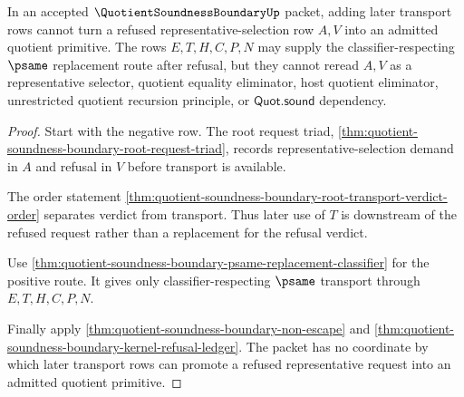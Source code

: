 \begin{theorem}
\label{thm:quotient-soundness-boundary-refusal-verdict-monotonicity}
In an accepted $\QuotientSoundnessBoundaryUp$ packet, adding later transport rows cannot turn a refused representative-selection row $A,V$ into an admitted quotient primitive. The rows $E,T,H,C,P,N$ may supply the classifier-respecting $\psame$ replacement route after refusal, but they cannot reread $A,V$ as a representative selector, quotient equality eliminator, host quotient eliminator, unrestricted quotient recursion principle, or $\mathsf{Quot.sound}$ dependency.
\end{theorem}
\begin{proof}
Start with the negative row. The root request triad, \autoref{thm:quotient-soundness-boundary-root-request-triad}, records representative-selection demand in $A$ and refusal in $V$ before transport is available.

The order statement \autoref{thm:quotient-soundness-boundary-root-transport-verdict-order} separates verdict from transport. Thus later use of $T$ is downstream of the refused request rather than a replacement for the refusal verdict.

Use \autoref{thm:quotient-soundness-boundary-psame-replacement-classifier} for the positive route. It gives only classifier-respecting $\psame$ transport through $E,T,H,C,P,N$.

Finally apply \autoref{thm:quotient-soundness-boundary-non-escape} and \autoref{thm:quotient-soundness-boundary-kernel-refusal-ledger}. The packet has no coordinate by which later transport rows can promote a refused representative request into an admitted quotient primitive.
\end{proof}

